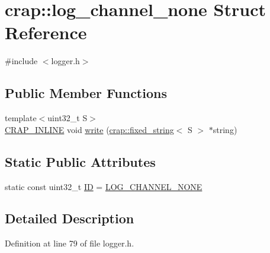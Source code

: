 \hypertarget{structcrap_1_1log__channel__none}{\section{crap\+:\+:log\+\_\+channel\+\_\+none Struct Reference}
\label{structcrap_1_1log__channel__none}
}


{\ttfamily \#include $<$logger.\+h$>$}

\subsection*{Public Member Functions}
\begin{DoxyCompactItemize}
\item 
{\footnotesize template$<$uint32\+\_\+t S$>$ }\\\hyperlink{config__x86_8h_a5a40526b8d842e7ff731509998bb0f1c}{C\+R\+A\+P\+\_\+\+I\+N\+L\+I\+N\+E} void \hyperlink{structcrap_1_1log__channel__none_a42266d60908df5f29eeae4c1783b0d35}{write} (\hyperlink{classcrap_1_1fixed__string}{crap\+::fixed\+\_\+string}$<$ S $>$ $\ast$string)
\end{DoxyCompactItemize}
\subsection*{Static Public Attributes}
\begin{DoxyCompactItemize}
\item 
static const uint32\+\_\+t \hyperlink{structcrap_1_1log__channel__none_a89fbd07fda3d141e97186a0e8bee52b8}{I\+D} = \hyperlink{logger_8h_a174a79b60892db79419f17fa90b664ce}{L\+O\+G\+\_\+\+C\+H\+A\+N\+N\+E\+L\+\_\+\+N\+O\+N\+E}
\end{DoxyCompactItemize}


\subsection{Detailed Description}


Definition at line 79 of file logger.\+h.



